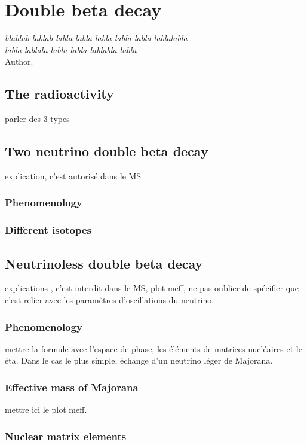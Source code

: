 \documentclass[main.tex]{subfiles}
\begin{document}
\chapter{Double beta decay}
 \begin{flushright}
\textit{blablab lablab labla labla labla labla labla lablalabla \\ 
labla lablala labla labla lablabla labla}\\
Author.
\end{flushright} 


\section{The radioactivity}
\NI parler des 3 types

\section{Two neutrino double beta decay}
\NI explication, c'est autorisé dans le MS

\subsection{Phenomenology}
\subsection{Different isotopes}

\section{Neutrinoless double beta decay}
\NI explications , c'est interdit dans le MS, plot meff, ne pas oublier de spécifier que c'est relier avec les paramètres d'oscillations du neutrino.
\subsection{Phenomenology}
\NI mettre la formule avec l'espace de phase, les éléments de matrices nucléaires et le éta. Dans le cas le plus simple, échange d'un neutrino léger de Majorana.

\subsection{Effective mass of Majorana}
\NI mettre ici le plot meff.

\subsection{Nuclear matrix elements}
\end{document}
